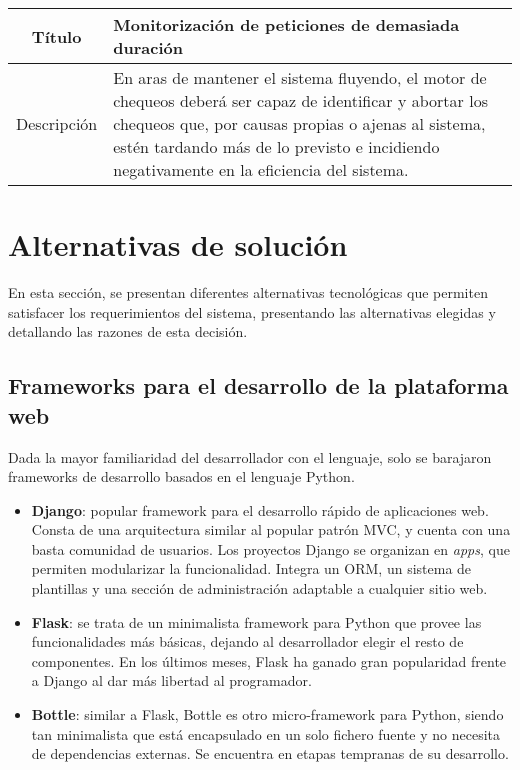 \begin{center}
  
  \begin{tabularx}{\textwidth}{|c|X|}
    \hline
    Título & Monitorización de peticiones de demasiada duración \\

    \hline

    Descripción & En aras de mantener el sistema fluyendo, el motor de chequeos
    deberá ser capaz de identificar y abortar los chequeos que, por causas
    propias o ajenas al sistema, estén tardando más de lo previsto e incidiendo
    negativamente en la eficiencia del sistema. \\

    \hline
  \end{tabularx}
\end{center}

\section{Alternativas de solución}
\label{sec:alternativas-solucion}

En esta sección, se presentan diferentes alternativas tecnológicas que permiten
satisfacer los requerimientos del sistema, presentando las alternativas elegidas
y detallando las razones de esta decisión.


\subsection{Frameworks para el desarrollo de la plataforma web}

Dada la mayor familiaridad del desarrollador con el lenguaje, solo se barajaron
frameworks de desarrollo basados en el lenguaje Python.

\begin{itemize}
\item \textbf{Django}\cite{django}: popular framework para el desarrollo rápido
  de aplicaciones web. Consta de una arquitectura similar al popular patrón
  \ac{MVC}, y cuenta con una basta comunidad de usuarios. Los proyectos Django
  se organizan en \textit{apps}, que permiten modularizar la
  funcionalidad. Integra un \ac{ORM}, un sistema de plantillas y una sección de
  administración adaptable a cualquier sitio web.

\item \textbf{Flask}\cite{flask}: se trata de un minimalista framework para Python que
  provee las funcionalidades más básicas, dejando al desarrollador elegir el
  resto de componentes. En los últimos meses, Flask ha ganado gran popularidad
  frente a Django al dar más libertad al programador.

\item \textbf{Bottle}\cite{bottle}: similar a Flask, Bottle es otro
  micro-framework para Python, siendo tan minimalista que está encapsulado en un
  solo fichero fuente y no necesita de dependencias externas. Se encuentra en
  etapas tempranas de su desarrollo.

\end{itemize}

